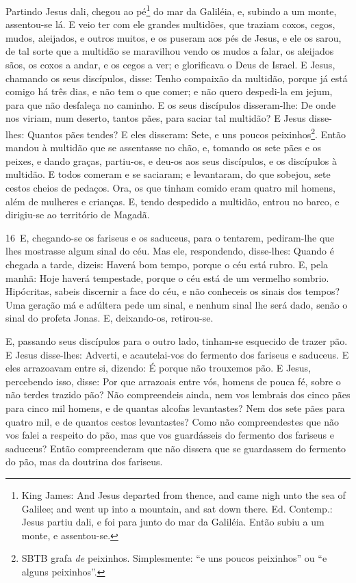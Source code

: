 Partindo Jesus dali, chegou ao pé\footnote{King James: And Jesus
departed from thence, and came nigh unto the sea of Galilee; and
went up into a mountain, and sat down there. Ed. Contemp.: Jesus
partiu dali, e foi para junto do mar da Galiléia. Então subiu a um
monte, e assentou-se.} do mar da Galiléia, e, subindo a um monte,
as\-sen\-tou-se lá. E veio ter com ele grandes multidões, que
traziam coxos, cegos, mudos, aleijados, e outros muitos, e os
puseram aos pés de Jesus, e ele os sarou, de tal sorte que a
multidão se maravilhou vendo os mudos a falar, os aleijados sãos, os
coxos a andar, e os cegos a ver; e glorificava o Deus de Israel.
E Jesus, chamando os seus discípulos, disse: Tenho compaixão
da multidão, porque já está comigo há três dias, e não tem o que
comer; e não quero despedi-la em jejum, para que não desfaleça no
caminho. E os seus discípulos disseram-lhe: De onde nos
viriam, num deserto, tantos pães, para saciar tal multidão? E
Jesus disse-lhes: Quantos pães tendes? E eles disseram: Sete, e uns
poucos peixinhos\footnote{SBTB grafa \emph{de} peixinhos.
Simplesmente: ``e uns poucos peixinhos'' ou ``e alguns
peixinhos''.}. Então mandou à multidão que se assentasse no
chão, e, tomando os sete pães e os peixes, e dando graças,
partiu-os, e deu-os aos seus discípulos, e os discípulos à multidão.
E todos comeram e se saciaram; e levantaram, do que sobejou,
sete cestos cheios de pedaços. Ora, os que tinham comido eram
quatro mil homens, além de mulheres e crianças. E, tendo
despedido a multidão, entrou no barco, e dirigiu-se ao território de
Magadã.

\medskip

\lettrine{16}\ E, chegando-se os fariseus e os saduceus, para o
tentarem, pe\-di\-ram-lhe que lhes mostrasse algum sinal do céu. Mas
ele, respondendo, disse-lhes: Quando é chegada a tarde, dizeis:
Haverá bom tempo, porque o céu está rubro. E, pela manhã: Hoje
haverá tempestade, porque o céu está de um vermelho sombrio.
Hipócritas, sabeis discernir a face do céu, e não conheceis os
sinais dos tempos? Uma geração má e adúltera pede um sinal, e
nenhum sinal lhe será dado, senão o sinal do profeta Jonas. E,
deixando-os, retirou-se.

E, passando seus discípulos para o outro lado, tinham-se esquecido
de trazer pão. E Jesus disse-lhes: Adverti, e acautelai-vos do
fermento dos fariseus e saduceus. E eles arrazoavam entre si,
dizendo: É porque não trouxemos pão. E Jesus, percebendo isso,
disse: Por que arrazoais entre vós, homens de pouca fé, sobre o não
terdes trazido pão? Não compreendeis ainda, nem vos lembrais dos
cinco pães para cinco mil homens, e de quantas alcofas levantastes?
Nem dos sete pães para quatro mil, e de quantos cestos
levantastes? Como não compreendestes que não vos falei a
respeito do pão, mas que vos guardásseis do fermento dos fariseus e
saduceus? Então compreenderam que não dissera que se
guardassem do fermento do pão, mas da doutrina dos fariseus.

